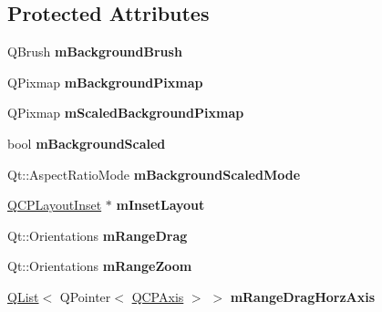 \subsection*{Protected Attributes}
\begin{DoxyCompactItemize}
\item 
\mbox{\label{class_q_c_p_axis_rect_a5748e1a37f63c428e38b0a7724b46259}} 
Q\+Brush {\bfseries m\+Background\+Brush}
\item 
\mbox{\label{class_q_c_p_axis_rect_a38fb1a15f43228a0c124553649303722}} 
Q\+Pixmap {\bfseries m\+Background\+Pixmap}
\item 
\mbox{\label{class_q_c_p_axis_rect_aa74b9415598d59b49290e41e42d7ee27}} 
Q\+Pixmap {\bfseries m\+Scaled\+Background\+Pixmap}
\item 
\mbox{\label{class_q_c_p_axis_rect_a5ad835f0fae5d7cc5ada9e063641dbf1}} 
bool {\bfseries m\+Background\+Scaled}
\item 
\mbox{\label{class_q_c_p_axis_rect_a859fd368e794663e346b4f53f35078e9}} 
Qt\+::\+Aspect\+Ratio\+Mode {\bfseries m\+Background\+Scaled\+Mode}
\item 
\mbox{\label{class_q_c_p_axis_rect_aecc8c4a23820ed82017ca998f3d2c526}} 
\hyperlink{class_q_c_p_layout_inset}{Q\+C\+P\+Layout\+Inset} $\ast$ {\bfseries m\+Inset\+Layout}
\item 
\mbox{\label{class_q_c_p_axis_rect_aa9f107f66ca3469ad50ee6cea7c9e237}} 
Qt\+::\+Orientations {\bfseries m\+Range\+Drag}
\item 
\mbox{\label{class_q_c_p_axis_rect_a215eff671d48df2edccc36e7f976f28c}} 
Qt\+::\+Orientations {\bfseries m\+Range\+Zoom}
\item 
\mbox{\label{class_q_c_p_axis_rect_a53c654a3f5c3d2cc933b1182844ddcea}} 
\hyperlink{class_q_list}{Q\+List}$<$ Q\+Pointer$<$ \hyperlink{class_q_c_p_axis}{Q\+C\+P\+Axis} $>$ $>$ {\bfseries m\+Range\+Drag\+Horz\+Axis}
\item 
\mbox{\label{class_q_c_p_axis_rect_ad476bc1f62e85c194f8f156248b39903}} 

\end{DoxyCompactItemize}
